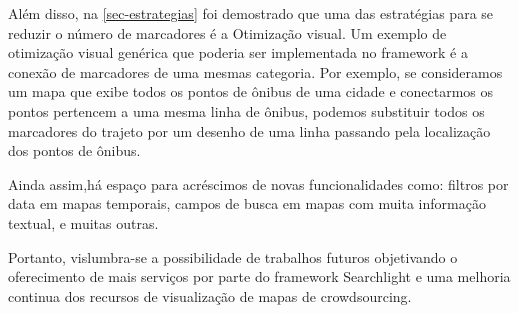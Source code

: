 Além disso, na \autoref{sec-estrategias} foi demostrado que uma das estratégias para se reduzir o número de marcadores é a Otimização visual. Um exemplo de otimização visual genérica que poderia ser implementada no framework é a conexão de marcadores de uma mesmas categoria. Por exemplo, se consideramos um mapa que exibe todos os pontos de ônibus de uma cidade e conectarmos os pontos pertencem a uma mesma linha de ônibus, podemos substituir todos os marcadores do trajeto por um desenho de uma linha passando pela localização dos pontos de ônibus. 

Ainda assim,há espaço para acréscimos de novas funcionalidades  como: filtros por data em mapas temporais, campos de busca em mapas com muita informação textual, e muitas outras.  

Portanto, vislumbra-se a possibilidade de trabalhos futuros objetivando o oferecimento de mais serviços por parte do framework Searchlight e uma melhoria continua dos recursos de visualização de mapas de crowdsourcing.
